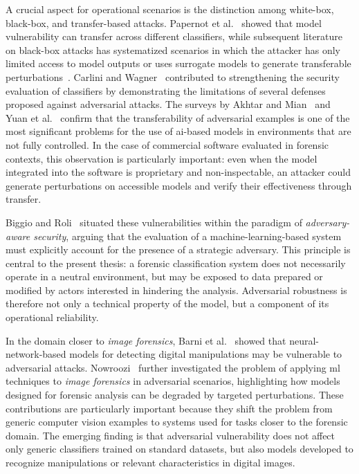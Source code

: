 A crucial aspect for operational scenarios is the distinction among white-box,
black-box, and transfer-based attacks. Papernot et
al.~\cite{papernot2016limitations} showed that model vulnerability can transfer
across different classifiers, while subsequent literature on black-box attacks
has systematized scenarios in which the attacker has only limited access to
model outputs or uses surrogate models to generate transferable
perturbations~\cite{bhambri2020survey}. Carlini and
Wagner~\cite{carlini2017towards} contributed to strengthening the security
evaluation of classifiers by demonstrating the limitations of several defenses
proposed against adversarial attacks. The surveys by Akhtar and
Mian~\cite{akhtar2018threat} and Yuan et al.~\cite{yuan2019adversarial}
confirm that the transferability of adversarial examples is one of the most
significant problems for the use of \gls{ai}-based models in environments that
are not fully controlled. In the case of commercial software evaluated in
forensic contexts, this observation is particularly important: even when the
model integrated into the software is proprietary and non-inspectable, an
attacker could generate perturbations on accessible models and verify their
effectiveness through transfer.

Biggio and Roli~\cite{biggio2018wild} situated these vulnerabilities within the
paradigm of \textit{adversary-aware security}, arguing that the evaluation of a
machine-learning-based system must explicitly account for the presence of a
strategic adversary. This principle is central to the present thesis: a
forensic classification system does not necessarily operate in a neutral
environment, but may be exposed to data prepared or modified by actors
interested in hindering the analysis. Adversarial robustness is therefore not
only a technical property of the model, but a component of its operational
reliability.

In the domain closer to \textit{image forensics}, Barni et
al.~\cite{barni2018cf} showed that neural-network-based models for detecting
digital manipulations may be vulnerable to adversarial attacks.
Nowroozi~\cite{nowroozi2020phd} further investigated the problem of applying
\gls{ml} techniques to \textit{image forensics} in adversarial scenarios,
highlighting how models designed for forensic analysis can be degraded by
targeted perturbations. These contributions are particularly important because
they shift the problem from generic computer vision examples to systems used
for tasks closer to the forensic domain. The emerging finding is that
adversarial vulnerability does not affect only generic classifiers trained on
standard datasets, but also models developed to recognize manipulations or
relevant characteristics in digital images.

